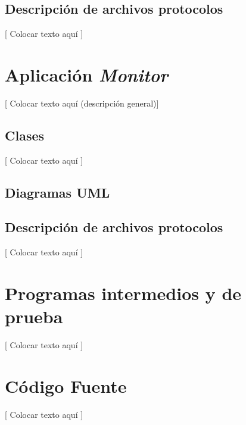 \documentclass{article}
\begin{document}
\subsection{Descripción de archivos  protocolos}

	[ Colocar texto aquí ]
\bigskip






\section{Aplicación \textit{Monitor}}

	[ Colocar texto aquí (descripción general)]
\bigskip



\subsection{Clases}

	[ Colocar texto aquí ]
\bigskip



\subsection{Diagramas UML}




\subsection{Descripción de archivos  protocolos}

	[ Colocar texto aquí ]
\bigskip










\section{Programas intermedios y de prueba}

	[ Colocar texto aquí ]
\bigskip




\section{Código Fuente}

	[ Colocar texto aquí ]
\bigskip
\end{document}
